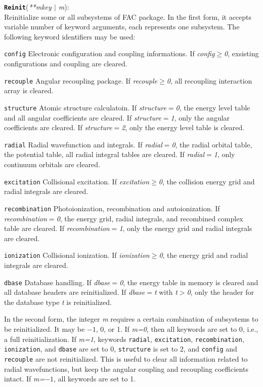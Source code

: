 \documentclass[twoside,letterpaper]{refrep}
\newcommand{\var}[1]{\textit{#1}}
\newcommand{\key}[1]{\texttt{#1}}
\newenvironment{ttscript}[1]{
	\begin{list}{}{
	\settowidth{\labelwidth}{\texttt{#1}}
	\setlength{\leftmargin}{\labelwidth}
	\addtolength{\leftmargin}{\labelsep}
	\setlength{\parsep}{0.5ex plus0.2ex minus0.2ex}
	\setlength{\itemsep}{0.3ex}
	\renewcommand{\makelabel}[1]{\texttt{##1\hfill}}}}
	{\end{list}}
\newenvironment{fundesc}[2]{
	\addcontentsline{toc}{subsubsection}{#1}
	\index{#1}
	\begin{center}
	\begin{minipage}{\textwidth}
	\key{\textbf{#1}}(\var{#2}):\\}
	{\end{minipage}\end{center}}
\begin{document}
\begin{fundesc}{Reinit}{\textnormal{**}mkey $|$ m}
Reinitialize some or all subsystems of FAC package. In the first form, it
accepts variable number of keyword arguments, each represents one
subsystem. The following keyword identifiers may be used:
\begin{ttscript}{recombination}
\item[\key{config}] Electronic configuration and coupling informations. If
\var{config$\ge$0}, exsisting configurations and coupling are cleared.
\item[\key{recouple}] Angular recoupling package. If \var{recouple$\ge$0}, all
recoupling interaction array is cleared.
\item[\key{structure}] Atomic structure calculatoin. If \var{structure$=$0},
the energy level table and all angular coefficients are cleared. If
\var{structure$=$1}, only the angular coefficients are cleared. If
\var{structure$=$2}, only the energy level table is cleared.
\item[\key{radial}] Radial wavefunction and integrals. If \var{radial$=$0}, the
radial orbital table, the potential table, all radial integral tables are
cleared. If \var{radial$=$1}, only continuum orbitals are cleared.
\item[\key{excitation}] Collisional excitation. If \var{excitation$\ge$0}, the
collision energy grid and radial integrals are cleared.
\item[\key{recombination}] Photoionization, recombination and
autoionization. If \var{recombination$=$0}, the energy grid, radial integrals,
and recombined complex table are cleared. If \var{recombination$=$1}, only the
energy grid and radial integrals are cleared.
\item[\key{ionization}] Collisional ionization. If \var{ionization$\ge$0}, the
energy grid and radial integrals are cleared.
\item[\key{dbase}] Database handling. If \var{dbase$=$0}, the energy table in
memory is cleared and all database headers are reinitialized. If
\var{dbase$=$t} with \var{t$>$0}, only the header for the database type
\var{t} is reinitialized.
\end{ttscript}

In the second form, the integer \var{m} requires a certain combination of
subsystems to be reinitialized. It may be $-1$, 0, or 1. If \var{m=0}, then all
keywords are set to 0, i.e., a full reinitialization. If \var{m=1}, keywords
\key{radial}, \key{excitation}, \key{recombination}, \key{ionization}, and
\key{dbase} are set to 0, \key{structure} is set to 2, and \key{config} and
\key{recouple} are not reinitialized. This is useful to clear all information
related to radial wavefunctions, but keep the angular coupling and recoupling
coefficients intact. If \var{m=$-1$}, all keywords are set to 1.
\end{fundesc}
\end{document}
